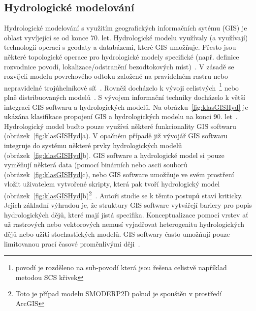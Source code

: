 \subsection*{Hydrologické modelování}
Hydrologické modelování s využitím geografických informačních sytému (GIS) je oblast vyvíjející se od konce 70. let. Hydrologické modelu využívaly (a využívají) technologii operací s geodaty a databázemi, které GIS umožňuje. Přesto jsou některé topologické operace pro hydrologické modely specifické (např. definice rozvodnice povodí, lokalizace/odstranění bezodtokových míst)~\citep{devantier1993}. V zásadě se rozvíjeli modelu povrchového odtoku založené na pravidelném rastru nebo nepravidelné trojúhelníkové síť~\citep{devantier1993}. Rovněž docházelo k vývoji celistvých~\footnote{povodí je rozděleno na sub-povodí která jsou řešena celistvě například metodou SCS křivek} nebo plně distribuovaných modelů~\citep{devantier1993}. S vývojem informační techniky docházelo k větší integraci GIS softwaru a hydrologických modelů. Na obrázku~\ref{fig:klasGISHyd} je ukázána klasifikace propojení GIS a hydrologických modelu na konci 90. let~\citep{sui1999}. Hydrologický model buďto pouze využívá některé funkcionality GIS softwaru (obrázek~\ref{fig:klasGISHyd}a). V opačném případě již vývojář GIS softwaru integruje do systému některé prvky hydrologických modelů (obrázek~\ref{fig:klasGISHyd}b). GIS software a hydrologické model si pouze vyměňují některá data (pomocí binárních nebo ascii souborů (obrázek~\ref{fig:klasGISHyd}c), nebo GIS software umožňuje ve svém prostření vložit uživatelem vytvořené skripty, která pak tvoří hydrologický model (obrázek~\ref{fig:klasGISHyd}b)\footnote{Toto je případ modelu SMODERP2D pokud je spouštěn v prostředí ArcGIS}~\citep{sui1999}. Autoři studie se k těmto postupů staví kriticky. Jejich základní výhradou je, že struktury GIS software vytvářejí bariery pro popis hydrologických dějů, které mají jistá specifika. Konceptualizace pomocí vrstev ať už rastrových  nebo vektorových nemusí vyjadřovat heterogenitu hydrologických dějů nebo užití stochastických modelů. GIS softwary často umožňují pouze limitovanou prací časové proměnlivými ději~\citep{sui1999}.

